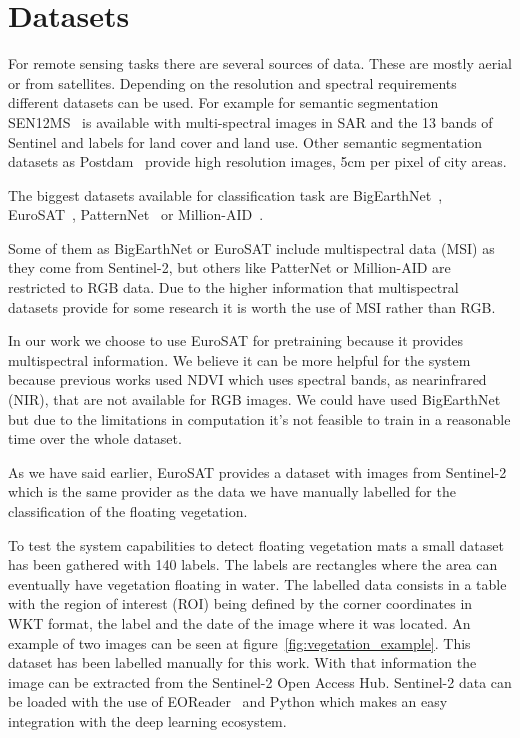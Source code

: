 \documentclass[conference]{IEEEtran}
\begin{document}
    \section{Datasets}\label{sec:dataset}
    For remote sensing tasks there are several sources of data.
    These are mostly aerial or from satellites.
    Depending on the resolution and spectral requirements different datasets can be used.
    For example for semantic segmentation SEN12MS~\cite{SEN12MS_dataset} is available with multi-spectral images
    in SAR and the 13 bands of Sentinel and labels for land cover and land use.
    Other semantic segmentation datasets as Postdam~\cite{postdam_dataset} provide high resolution images, 5cm per pixel of
    city areas.

    The biggest datasets available for classification task are BigEarthNet~\cite{bigearthnet}, EuroSAT~\cite{helber2019eurosat},
    PatternNet~\cite{patternet} or Million-AID~\cite{millionaid}.

    Some of them as BigEarthNet or EuroSAT include multispectral data (MSI) as they come from Sentinel-2, but others like PatterNet or Million-AID are restricted to RGB data.
    Due to the higher information that multispectral datasets provide for some research it is worth the use of MSI rather than RGB\@.

    In our work we choose to use EuroSAT for pretraining because it provides multispectral information.
    We believe it can be more helpful for the system because previous works used NDVI which uses spectral bands, as nearinfrared (NIR), that are not available for RGB images.
    We could have used BigEarthNet but due to the limitations in computation it's not feasible to train in a reasonable time over the whole dataset.

    As we have said earlier, EuroSAT provides a dataset with images from Sentinel-2 which is the same provider as the data
    we have manually labelled for the classification of the floating vegetation.

    To test the system capabilities to detect floating vegetation mats a small dataset has been gathered with 140 labels.
    The labels are rectangles where the area can eventually have vegetation floating in water.
    The labelled data consists in a table with the region of interest (ROI) being defined by the corner coordinates in WKT format, the label and the date
    of the image where it was located.
    An example of two images can be seen at figure~\ref{fig:vegetation_example}.
    This dataset has been labelled manually for this work.
    With that information the image can be extracted from the Sentinel-2 Open Access Hub.
    Sentinel-2 data can be loaded with the use of EOReader~\cite{eoreader_paper} and Python which makes an easy integration with the deep learning ecosystem.
\end{document}
